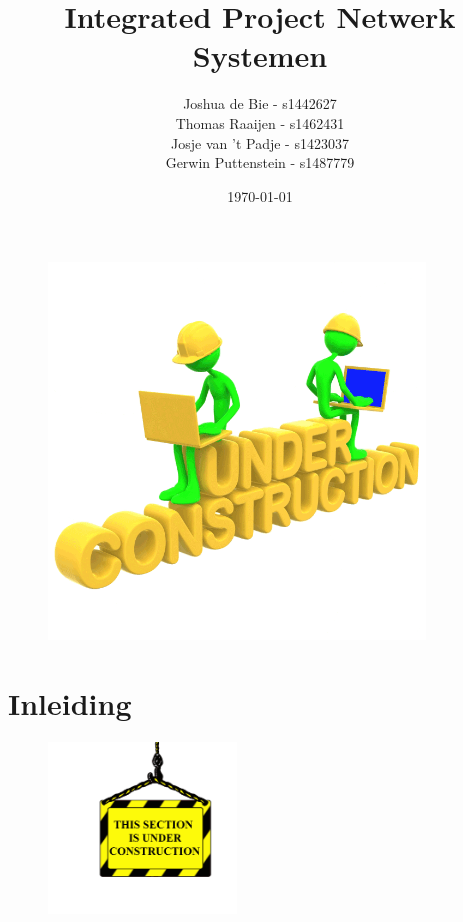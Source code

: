 \documentclass[12pt]{article}
\author{Joshua de Bie - s1442627\\Thomas Raaijen - s1462431\\Josje van 't Padje - s1423037\\Gerwin Puttenstein - s1487779}
\date{\today}
\title{Integrated Project Netwerk Systemen}
\begin{document}
\maketitle

\begin{figure}[h] 
\begin{center} 
\includegraphics[width=10cm]{uc1} 
\end{center}  
\end{figure}
\thispagestyle{empty}
\setcounter{page}{0}
\newpage
\tableofcontents
\newpage
\section{Inleiding}
\begin{figure}[h] 
\includegraphics[width=5cm]{sectionuc} 
\end{figure}
\newpage


\end{document}
